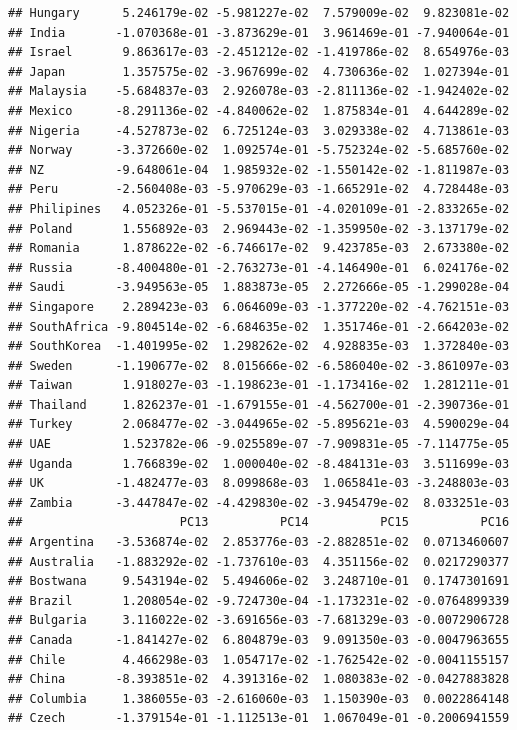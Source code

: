 \documentclass[11pt,preprint, authoryear]{elsarticle}
\numberwithin{equation}{section}
\numberwithin{figure}{section}
\numberwithin{table}{section}
\begin{document}
\begin{verbatim}
## Hungary      5.246179e-02 -5.981227e-02  7.579009e-02  9.823081e-02
## India       -1.070368e-01 -3.873629e-01  3.961469e-01 -7.940064e-01
## Israel       9.863617e-03 -2.451212e-02 -1.419786e-02  8.654976e-03
## Japan        1.357575e-02 -3.967699e-02  4.730636e-02  1.027394e-01
## Malaysia    -5.684837e-03  2.926078e-03 -2.811136e-02 -1.942402e-02
## Mexico      -8.291136e-02 -4.840062e-02  1.875834e-01  4.644289e-02
## Nigeria     -4.527873e-02  6.725124e-03  3.029338e-02  4.713861e-03
## Norway      -3.372660e-02  1.092574e-01 -5.752324e-02 -5.685760e-02
## NZ          -9.648061e-04  1.985932e-02 -1.550142e-02 -1.811987e-03
## Peru        -2.560408e-03 -5.970629e-03 -1.665291e-02  4.728448e-03
## Philipines   4.052326e-01 -5.537015e-01 -4.020109e-01 -2.833265e-02
## Poland       1.556892e-03  2.969443e-02 -1.359950e-02 -3.137179e-02
## Romania      1.878622e-02 -6.746617e-02  9.423785e-03  2.673380e-02
## Russia      -8.400480e-01 -2.763273e-01 -4.146490e-01  6.024176e-02
## Saudi       -3.949563e-05  1.883873e-05  2.272666e-05 -1.299028e-04
## Singapore    2.289423e-03  6.064609e-03 -1.377220e-02 -4.762151e-03
## SouthAfrica -9.804514e-02 -6.684635e-02  1.351746e-01 -2.664203e-02
## SouthKorea  -1.401995e-02  1.298262e-02  4.928835e-03  1.372840e-03
## Sweden      -1.190677e-02  8.015666e-02 -6.586040e-02 -3.861097e-03
## Taiwan       1.918027e-03 -1.198623e-01 -1.173416e-02  1.281211e-01
## Thailand     1.826237e-01 -1.679155e-01 -4.562700e-01 -2.390736e-01
## Turkey       2.068477e-02 -3.044965e-02 -5.895621e-03  4.590029e-04
## UAE          1.523782e-06 -9.025589e-07 -7.909831e-05 -7.114775e-05
## Uganda       1.766839e-02  1.000040e-02 -8.484131e-03  3.511699e-03
## UK          -1.482477e-03  8.099868e-03  1.065841e-03 -3.248803e-03
## Zambia      -3.447847e-02 -4.429830e-02 -3.945479e-02  8.033251e-03
##                      PC13          PC14          PC15          PC16
## Argentina   -3.536874e-02  2.853776e-03 -2.882851e-02  0.0713460607
## Australia   -1.883292e-02 -1.737610e-03  4.351156e-02  0.0217290377
## Bostwana     9.543194e-02  5.494606e-02  3.248710e-01  0.1747301691
## Brazil       1.208054e-02 -9.724730e-04 -1.173231e-02 -0.0764899339
## Bulgaria     3.116022e-02 -3.691656e-03 -7.681329e-03 -0.0072906728
## Canada      -1.841427e-02  6.804879e-03  9.091350e-03 -0.0047963655
## Chile        4.466298e-03  1.054717e-02 -1.762542e-02 -0.0041155157
## China       -8.393851e-02  4.391316e-02  1.080383e-02 -0.0427883828
## Columbia     1.386055e-03 -2.616060e-03  1.150390e-03  0.0022864148
## Czech       -1.379154e-01 -1.112513e-01  1.067049e-01 -0.2006941559

\end{verbatim}
\end{document}
